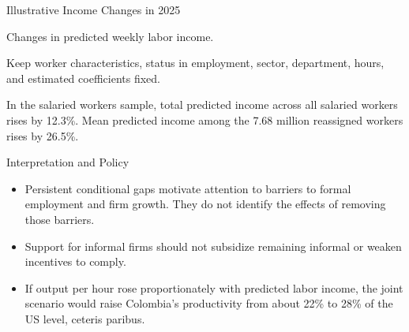 \begin{frame}{Illustrative Income Changes in 2025}
  \centering\small
  \setlength{\tabcolsep}{4pt}
  
  \par\smallskip
  {\footnotesize Changes in predicted weekly labor income.\par}
  \par\vspace{0.2cm}
  {\small Keep worker characteristics, status in employment, sector, department, hours, and estimated coefficients fixed.\par}
  \par\smallskip
  {\small In the salaried workers sample, total predicted income across all salaried workers rises by 12.3\%. Mean predicted income among the 7.68 million reassigned workers rises by 26.5\%.\par}
\end{frame}

\begin{frame}{Interpretation and Policy}
  \begin{itemize}
    \item Persistent conditional gaps motivate attention to barriers to formal employment and firm growth. They do not identify the effects of removing those barriers.
    \item Support for informal firms should not subsidize remaining informal or weaken incentives to comply.
    \item If output per hour rose proportionately with predicted labor income, the joint scenario would raise Colombia's productivity from about 22\% to 28\% of the US level, ceteris paribus.
  \end{itemize}
  \vspace{0.25cm}
\end{frame}

